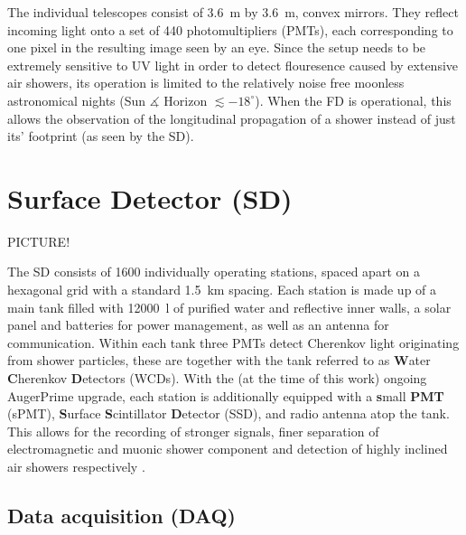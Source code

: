 The individual telescopes consist of \SI{3.6}{\meter} by \SI{3.6}{\meter}, convex mirrors. They reflect incoming light onto a set of 440 
photomultipliers (PMTs), each corresponding to one pixel in the resulting image seen by an eye. Since the setup needs to be extremely sensitive to 
UV light in order to detect flouresence caused by extensive air showers, its operation is limited to the relatively noise free moonless astronomical 
nights (Sun $\measuredangle$ Horizon $\lesssim-18^{\circ}$). When the FD is operational, this allows the observation of the longitudinal propagation of 
a shower instead of just its' footprint (as seen by the SD). 

\section{Surface Detector (SD)}
\label{sec:surface-detector}

\TODO PICTURE!

The SD consists of 1600 individually operating stations, spaced apart on a hexagonal grid with a standard \SI{1.5}{\kilo\meter} spacing. Each 
station is made up of a main tank filled with \SI{12000}{\litre} of purified water and reflective inner walls, a solar panel and batteries for power management, 
as well as an antenna for communication. Within each tank three PMTs detect Cherenkov light originating from shower particles, these are together with the tank 
referred to as \textbf{W}ater \textbf{C}herenkov \textbf{D}etectors (WCDs). With the (at the time of this work) ongoing AugerPrime upgrade, each station is 
additionally equipped with a \textbf{s}mall \textbf{PMT} (sPMT), \textbf{S}urface \textbf{S}cintillator \textbf{D}etector (SSD), and radio antenna atop the tank.
This allows for the recording of stronger signals, finer separation of electromagnetic and muonic shower component and detection of highly inclined air showers 
respectively \cite{AugerPrime, horandel2020precision}. 

\subsection{Data acquisition (DAQ)}
\label{ssec:sd-daq}

